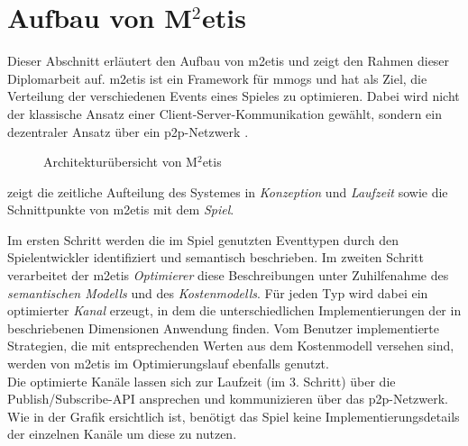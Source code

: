 \section{Aufbau von M$^2$etis}
\label{chap:grundlagen:aufbau_metis}

Dieser Abschnitt erläutert den Aufbau von \ac{m2etis}  und zeigt den Rahmen dieser Diplomarbeit auf. \ac{m2etis} ist ein Framework für \acp{mmog} und hat als Ziel, die Verteilung der verschiedenen Events eines Spieles zu optimieren. Dabei wird nicht der klassische Ansatz einer Client-Server-Kommunikation gewählt, sondern ein dezentraler Ansatz über ein \ac{p2p}-Netzwerk \cite{Fischer2010a, Fischer2010Event}.

\begin{figure}[htbp]
\centering
{}
\caption{Architekturübersicht von M$^2$etis}
\label{fig:metis_aufbau}
\end{figure}

 zeigt die zeitliche Aufteilung des Systemes in \emph{Konzeption} und \emph{Laufzeit} sowie die Schnittpunkte von \ac{m2etis} mit dem \emph{Spiel}.

Im ersten Schritt werden die im Spiel genutzten Eventtypen durch den Spielentwickler identifiziert und semantisch beschrieben. Im zweiten Schritt verarbeitet der \ac{m2etis} \emph{Optimierer} diese Beschreibungen unter Zuhilfenahme des \emph{semantischen Modells} und des \emph{Kostenmodells}. Für jeden Typ wird dabei ein optimierter \emph{Kanal} erzeugt, in dem die unterschiedlichen Implementierungen der in \cite{Fischer2010a} beschriebenen Dimensionen Anwendung finden. Vom Benutzer implementierte Strategien, die mit entsprechenden Werten aus dem Kostenmodell versehen sind, werden von \ac{m2etis} im Optimierungslauf ebenfalls genutzt.\\
Die optimierte Kanäle lassen sich zur Laufzeit (im 3. Schritt) über die Publish/Subscribe-API ansprechen und kommunizieren über das \ac{p2p}-Netzwerk. Wie in der Grafik ersichtlich ist, benötigt das Spiel keine Implementierungsdetails der einzelnen Kanäle um diese zu nutzen.


